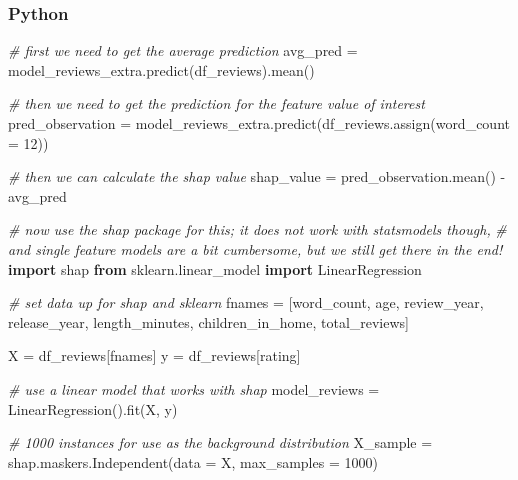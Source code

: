 \documentclass[
  letterpaper,
]{krantz}
\newenvironment{Shaded}{}{}
\newcommand{\CommentTok}[1]{\textcolor[rgb]{0.38,0.63,0.69}{\textit{#1}}}
\newcommand{\DecValTok}[1]{\textcolor[rgb]{0.25,0.63,0.44}{#1}}
\newcommand{\ImportTok}[1]{\textcolor[rgb]{0.00,0.50,0.00}{\textbf{#1}}}
\newcommand{\NormalTok}[1]{#1}
\newcommand{\OperatorTok}[1]{\textcolor[rgb]{0.40,0.40,0.40}{#1}}
\newcommand{\StringTok}[1]{\textcolor[rgb]{0.25,0.44,0.63}{#1}}
\begin{document}
\subsubsection{Python}

\begin{Shaded}
\begin{Highlighting}[]
\CommentTok{\# first we need to get the average prediction}
\NormalTok{avg\_pred }\OperatorTok{=}\NormalTok{ model\_reviews\_extra.predict(df\_reviews).mean()}

\CommentTok{\# then we need to get the prediction for the feature value of interest}
\NormalTok{pred\_observation }\OperatorTok{=}\NormalTok{ model\_reviews\_extra.predict(df\_reviews.assign(word\_count }\OperatorTok{=} \DecValTok{12}\NormalTok{))}

\CommentTok{\# then we can calculate the shap value}
\NormalTok{shap\_value }\OperatorTok{=}\NormalTok{ pred\_observation.mean() }\OperatorTok{{-}}\NormalTok{ avg\_pred}


\CommentTok{\# now use the shap package for this; it does not work with statsmodels though,}
\CommentTok{\# and single feature models are a bit cumbersome, but we still get there in the end!}
\ImportTok{import}\NormalTok{ shap}
\ImportTok{from}\NormalTok{ sklearn.linear\_model }\ImportTok{import}\NormalTok{ LinearRegression}

\CommentTok{\# set data up for shap and sklearn}
\NormalTok{fnames }\OperatorTok{=}\NormalTok{ [}\StringTok{\textquotesingle{}word\_count\textquotesingle{}}\NormalTok{, }\StringTok{\textquotesingle{}age\textquotesingle{}}\NormalTok{, }\StringTok{\textquotesingle{}review\_year\textquotesingle{}}\NormalTok{, }\StringTok{\textquotesingle{}release\_year\textquotesingle{}}\NormalTok{, }\StringTok{\textquotesingle{}length\_minutes\textquotesingle{}}\NormalTok{, }\StringTok{\textquotesingle{}children\_in\_home\textquotesingle{}}\NormalTok{, }\StringTok{\textquotesingle{}total\_reviews\textquotesingle{}}\NormalTok{]}

\NormalTok{X }\OperatorTok{=}\NormalTok{ df\_reviews[fnames]}
\NormalTok{y }\OperatorTok{=}\NormalTok{ df\_reviews[}\StringTok{\textquotesingle{}rating\textquotesingle{}}\NormalTok{]}

\CommentTok{\# use a linear model that works with shap}
\NormalTok{model\_reviews }\OperatorTok{=}\NormalTok{ LinearRegression().fit(X, y)}

\CommentTok{\# 1000 instances for use as the \textquotesingle{}background distribution\textquotesingle{}}
\NormalTok{X\_sample }\OperatorTok{=}\NormalTok{ shap.maskers.Independent(data }\OperatorTok{=}\NormalTok{ X, max\_samples }\OperatorTok{=} \DecValTok{1000}\NormalTok{)  }


\end{Highlighting}
\end{Shaded}
\end{document}
